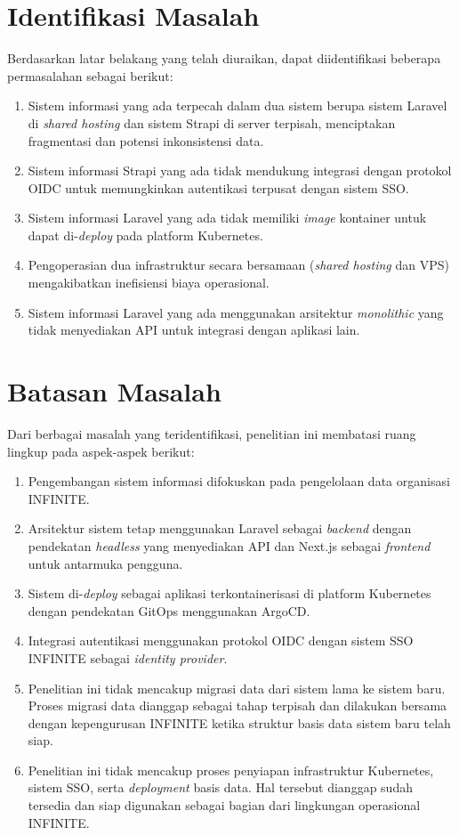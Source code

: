 \section{Identifikasi Masalah}
Berdasarkan latar belakang yang telah diuraikan, dapat diidentifikasi beberapa permasalahan sebagai berikut:
\begin{enumerate}
	\item Sistem informasi yang ada terpecah dalam dua sistem berupa sistem Laravel di \textit{shared hosting} dan sistem Strapi di server terpisah, menciptakan fragmentasi dan potensi inkonsistensi data.
	\item Sistem informasi Strapi yang ada tidak mendukung integrasi dengan protokol OIDC untuk memungkinkan autentikasi terpusat dengan sistem SSO.
	\item Sistem informasi Laravel yang ada tidak memiliki \textit{image} kontainer untuk dapat di-\textit{deploy} pada platform Kubernetes.
	\item Pengoperasian dua infrastruktur secara bersamaan (\textit{shared hosting} dan VPS) mengakibatkan inefisiensi biaya operasional.
	\item Sistem informasi Laravel yang ada menggunakan arsitektur \textit{monolithic} yang tidak menyediakan API untuk integrasi dengan aplikasi lain.
\end{enumerate}

\section{Batasan Masalah}
Dari berbagai masalah yang teridentifikasi, penelitian ini membatasi ruang lingkup pada aspek-aspek berikut:
\begin{enumerate}
	\item Pengembangan sistem informasi difokuskan pada pengelolaan data organisasi INFINITE.
	\item Arsitektur sistem tetap menggunakan Laravel sebagai \textit{backend} dengan pendekatan \textit{headless} yang menyediakan API dan Next.js sebagai \textit{frontend} untuk antarmuka pengguna.
	\item Sistem di-\textit{deploy} sebagai aplikasi terkontainerisasi di platform Kubernetes dengan pendekatan GitOps menggunakan ArgoCD.
	\item Integrasi autentikasi menggunakan protokol OIDC dengan sistem SSO INFINITE sebagai \textit{identity provider}.
	\item Penelitian ini tidak mencakup migrasi data dari sistem lama ke sistem baru. Proses migrasi data dianggap sebagai tahap terpisah dan dilakukan bersama dengan kepengurusan INFINITE ketika struktur basis data sistem baru telah siap.
	\item Penelitian ini tidak mencakup proses penyiapan infrastruktur Kubernetes, sistem SSO, serta \textit{deployment} basis data. Hal tersebut dianggap sudah tersedia dan siap digunakan sebagai bagian dari lingkungan operasional INFINITE.
\end{enumerate}

